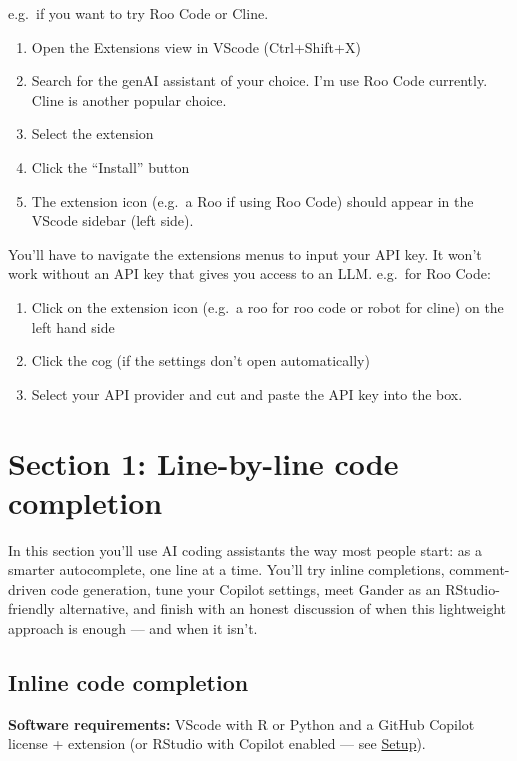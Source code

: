 \documentclass[
  letterpaper,
  DIV=11,
  numbers=noendperiod]{scrreprt}
\providecommand{\tightlist}{%
  \setlength{\itemsep}{0pt}\setlength{\parskip}{0pt}}
\begin{document}
e.g.~if you want to try Roo Code or Cline.

\begin{enumerate}
\def\labelenumi{\arabic{enumi}.}
\tightlist
\item
  Open the Extensions view in VScode (Ctrl+Shift+X)
\item
  Search for the genAI assistant of your choice. I'm use Roo Code
  currently. Cline is another popular choice.
\item
  Select the extension
\item
  Click the ``Install'' button
\item
  The extension icon (e.g.~a Roo if using Roo Code) should appear in the
  VScode sidebar (left side).
\end{enumerate}

You'll have to navigate the extensions menus to input your API key. It
won't work without an API key that gives you access to an LLM. e.g.~for
Roo Code:

\begin{enumerate}
\def\labelenumi{\arabic{enumi}.}
\tightlist
\item
  Click on the extension icon (e.g.~a roo for roo code or robot for
  cline) on the left hand side
\item
  Click the cog (if the settings don't open automatically)
\item
  Select your API provider and cut and paste the API key into the box.
\end{enumerate}

\part{Section 1: Line-by-line code completion}

In this section you'll use AI coding assistants the way most people
start: as a smarter autocomplete, one line at a time. You'll try inline
completions, comment-driven code generation, tune your Copilot settings,
meet Gander as an RStudio-friendly alternative, and finish with an
honest discussion of when this lightweight approach is enough --- and
when it isn't.

\chapter{Inline code completion}\label{inline-code-completion}

\textbf{Software requirements:} VScode with R or Python and a GitHub
Copilot license + extension (or RStudio with Copilot enabled --- see
\hyperref[setup]{Setup}).
\end{document}
